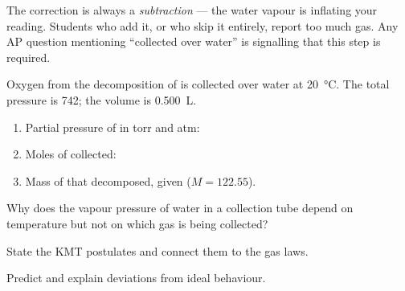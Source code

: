 \documentclass{apchem-notes}
\begin{document}
\begin{apctrap}
The correction is always a \emph{subtraction} --- the water vapour is
inflating your reading. Students who add it, or who skip it entirely, report
too much gas. Any AP question mentioning ``collected over water'' is
signalling that this step is required.
\end{apctrap}


Oxygen from the decomposition of  is collected over water at
\SI{20}{\celsius}. The total pressure is \SI{742}{\torr}; the volume is
\SI{0.500}{\liter}.

\begin{enumerate}[leftmargin=*,itemsep=0.4em]
  \item Partial pressure of  in torr and atm:
  \item Moles of  collected: \workspace[2.2cm]
  \item Mass of  that decomposed, given
         ($M = 122.55$). \workspace[2.2cm]
\end{enumerate}

\begin{exitticket}
Why does the vapour pressure of water in a collection tube depend on
temperature but not on which gas is being collected?
\end{exitticket}


\begin{objectives}
  \item State the KMT postulates and connect them to the gas laws.
  \item Predict and explain deviations from ideal behaviour.
\end{objectives}
\end{document}
